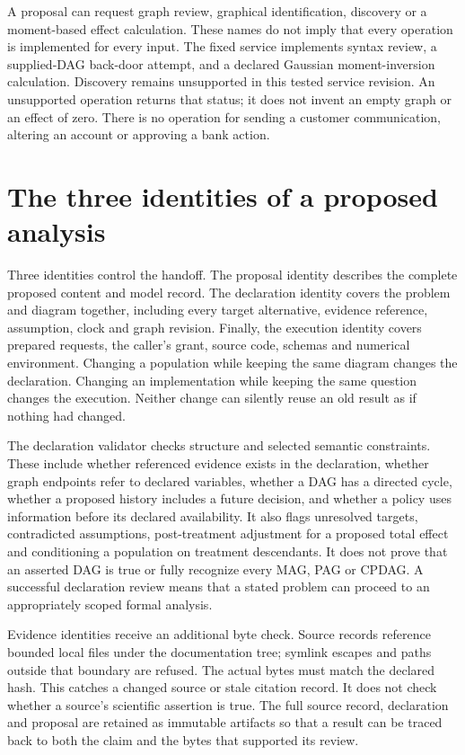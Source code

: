 A proposal can request graph review, graphical identification, discovery or a
moment-based effect calculation. These names do not imply that every operation
is implemented for every input. The fixed service implements syntax review,
a supplied-DAG back-door attempt, and a declared Gaussian moment-inversion
calculation. Discovery remains unsupported in this tested service revision. An unsupported
operation returns that status; it does not invent an empty graph or an effect
of zero. There is no operation for sending a customer communication, altering
an account or approving a bank action.

\section{The three identities of a proposed analysis}

Three identities control the handoff. The proposal identity describes the
complete proposed content and model record. The declaration identity covers the
problem and diagram together, including every target alternative, evidence
reference, assumption, clock and graph revision. Finally, the execution identity
covers prepared requests, the caller's grant, source code, schemas and numerical
environment. Changing a population while keeping the same diagram changes the
declaration. Changing an implementation while keeping the same question changes
the execution. Neither change can silently reuse an old result as if nothing
had changed.

The declaration validator checks structure and selected semantic constraints.
These include whether referenced evidence exists in the declaration, whether
graph endpoints refer to declared variables, whether a DAG has a directed cycle,
whether a proposed history includes a future decision, and whether a policy
uses information before its declared availability. It also flags unresolved
targets, contradicted assumptions, post-treatment adjustment for a proposed
total effect and conditioning a population on treatment descendants. It does
not prove that an asserted DAG is true or fully recognize every MAG, PAG or
CPDAG. A successful declaration review means that a stated problem can proceed
to an appropriately scoped formal analysis.

Evidence identities receive an additional byte check. Source records reference
bounded local files under the documentation tree; symlink escapes and paths
outside that boundary are refused. The actual bytes must match the declared
hash. This catches a changed source or stale citation record. It does not check
whether a source's scientific assertion is true. The full source record,
declaration and proposal are retained as immutable artifacts so that a result
can be traced back to both the claim and the bytes that supported its review.

